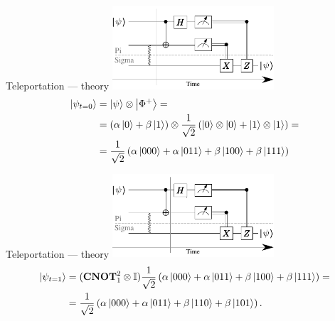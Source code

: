 \begin{frame}{Teleportation --- theory}
    \centering
    \includegraphics[width=0.45\textwidth]{pics/teleportation/teleportation_t0}
	\begin{equation*}
		\begin{split}
		\ket{\psi_{t=0}} &=  \ket{\psi} \otimes \ket{\Phi^+}  =\\
			&= \left(\alpha \ket{0} + \beta  \ket{1}\right) \otimes \frac{1}{\sqrt{2}}\left( \ket{0} \otimes \ket{0} +\ket{1} \otimes \ket{1} \right)= \\
			&= \frac{1}{\sqrt{2}} \left(\alpha \ket{000} + \alpha \ket{011} + \beta  \ket{100} + \beta  \ket{111}  \right)
		\end{split}
	\end{equation*}
\end{frame}

\begin{frame}{Teleportation --- theory}
	\centering
    \includegraphics[width=0.45\textwidth]{pics/teleportation/teleportation_t1}
	\begin{equation*}
		\begin{split}
			\ket{\psi_{t=1}} &= (\mathbf{CNOT}_1^2\otimes \mathbb{I}) \frac{1}{\sqrt{2}} \left(\alpha \ket{000} + \alpha \ket{011} + \beta \ket{100} + \beta \ket{111}  \right) =\\
			&=\frac{1}{\sqrt{2}} \left(\alpha \ket{000} + \alpha \ket{011} + \beta \ket{110} + \beta \ket{101}  \right).
		\end{split}
	\end{equation*}
\end{frame}


